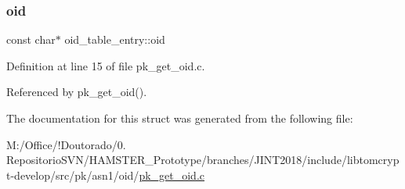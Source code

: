 \subsubsection{\texorpdfstring{oid}{oid}}
{\footnotesize\ttfamily const char$\ast$ oid\+\_\+table\+\_\+entry\+::oid}



Definition at line 15 of file pk\+\_\+get\+\_\+oid.\+c.



Referenced by pk\+\_\+get\+\_\+oid().



The documentation for this struct was generated from the following file\+:\begin{DoxyCompactItemize}
\item 
M\+:/\+Office/!\+Doutorado/0. Repositorio\+S\+V\+N/\+H\+A\+M\+S\+T\+E\+R\+\_\+\+Prototype/branches/\+J\+I\+N\+T2018/include/libtomcrypt-\/develop/src/pk/asn1/oid/\mbox{\hyperlink{pk__get__oid_8c}{pk\+\_\+get\+\_\+oid.\+c}}\end{DoxyCompactItemize}
